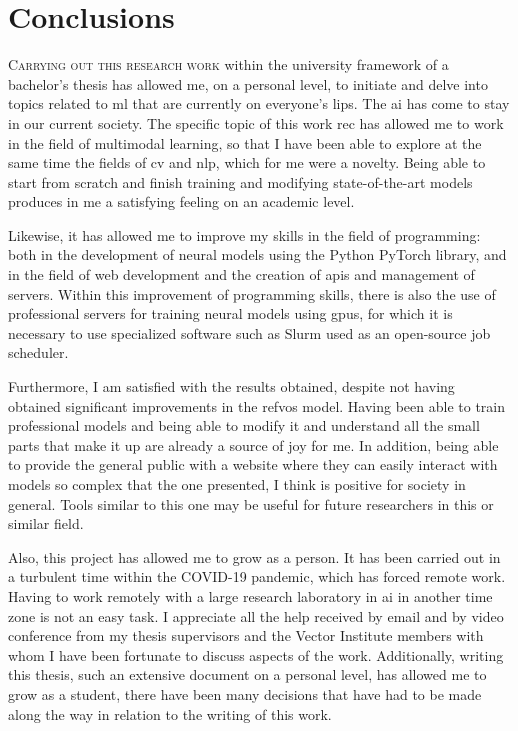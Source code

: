 

\chapter{Conclusions}\label{cha:concl}



\lettrine{C}{arrying out this research work} within the university framework of
a bachelor's thesis has allowed me, on a personal level, to initiate and delve
into topics related to \gls{ml} that are currently on everyone's lips. The
\gls{ai} has come to stay in our current society. The specific topic of this
work \gls{rec} has allowed me to work in the field of multimodal learning, so
that I have been able to explore at the same time the fields of \gls{cv} and
\gls{nlp}, which for me were a novelty. Being able to start from scratch and
finish training and modifying state-of-the-art models produces in me a
satisfying feeling on an academic level.

Likewise, it has allowed me to improve my skills in the field of programming:
both in the development of neural models using the Python PyTorch library, and
in the field of web development and the creation of \glspl{api} and management
of servers. Within this improvement of programming skills, there is also the
use of professional servers for training neural models using \acsp{gpu}, for
which it is necessary to use specialized software such as Slurm used as an
open-source job scheduler.

Furthermore, I am satisfied with the results obtained, despite not having
obtained significant improvements in the \gls{refvos} model. Having been able
to train professional models and being able to modify it and understand all the
small parts that make it up are already a source of joy for me. In addition,
being able to provide the general public with a website where they can easily
interact with models so complex that the one presented, I think is positive for
society in general. Tools similar to this one may be useful for future
researchers in this or similar field.

Also, this project has allowed me to grow as a person. It has been carried out
in a turbulent time within the COVID-19 pandemic, which has forced remote
work. Having to work remotely with a large research laboratory in \gls{ai} in
another time zone is not an easy task. I appreciate all the help received by
email and by video conference from my thesis supervisors and the Vector
Institute members with whom I have been fortunate to discuss aspects of the
work. Additionally, writing this thesis, such an extensive document on a
personal level, has allowed me to grow as a student, there have been many
decisions that have had to be made along the way in relation to the writing of
this work.



